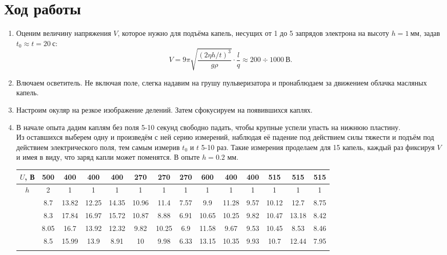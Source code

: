 \documentclass[a4paper,12pt]{article}
\begin{document}
\section*{Ход работы}
\begin{enumerate}
\item Оценим величину напряжения $V$, которое нужно для подъёма капель, несущих от 1 до 5 запрядов электрона на высоту $h = 1~\text{мм}$, задав $t_0 \approx t = 20~\text{с}$:
$$
V =  9\pi \sqrt{\dfrac{(2\eta h/t)^3}{g\rho}}\cdot \dfrac{l}{q} \approx 200 \div 1000~\text{В}.
$$
\item Влючаем осветитель. Не включая поле, слегка надавим на грушу пульверизатора и пронаблюдаем за движением облачка масляных капель.
\item Настроим окуляр на резкое изображение делений. Затем сфокусируем на появившихся каплях.
\item В начале опыта дадим каплям без поля 5-10 секунд свободно падать, чтобы крупные успели упасть на нижнюю пластину.\\
Из оставшихся выберем одну и произведём с ней серию измерений, наблюдая её падение под действием силы тяжести и подъём под действием электрического поля, тем самым измерив $t_0$ и $t$ 5-10 раз. Такие измерения проделаем для 15 капель, каждый раз фиксируя $V$ и имея в виду, что заряд капли может поменятся. В опыте $h = 0.2$ мм.
\newpage
\begin{table}[t]
\centering
\begin{tabular}{|c|c|c|c|c|c|c|c|c|c|c|c|c|c|}
\hline
$U$, В               & 500  & 400   & 400   & 400   & 270    & 270   & 270  & 600   & 400   & 400  & 515   & 515   & 515  \\ \hline
    $h$    & 2    & 1     & 1     & 1     & 1      & 1     & 1    & 1     & 1     & 1    & 1     & 1     & 1    \\ \hline
\multirow{11}{*}{} & 8.7  & 13.82 & 12.25 & 14.35 & 10.96  & 11.4  & 7.57 & 9.9   & 11.28 & 9.57 & 10.12 & 12.7  & 8.75 \\ \cline{2-14} 
                   & 8.3  & 17.84 & 16.97 & 15.72 & 10.87  & 8.88  & 6.91 & 10.65 & 10.25 & 9.82 & 10.47 & 13.18 & 8.42 \\ \cline{2-14} 
                   & 8.05 & 16.7  & 13.92 & 12.32 & 9.82   & 10.25 & 6.9  & 11.58 & 9.67  & 9.53 & 10.45 & 8.53  & 8.46 \\ \cline{2-14} 
                   & 8.5  & 15.99 & 13.9  & 8.91  & 10     & 9.98  & 6.33 & 13.15 & 10.35 & 9.93 & 10.7  & 12.44 & 7.95 \\ \cline{2-14} 

\end{tabular}
\end{table}
\end{enumerate}
\end{document}
